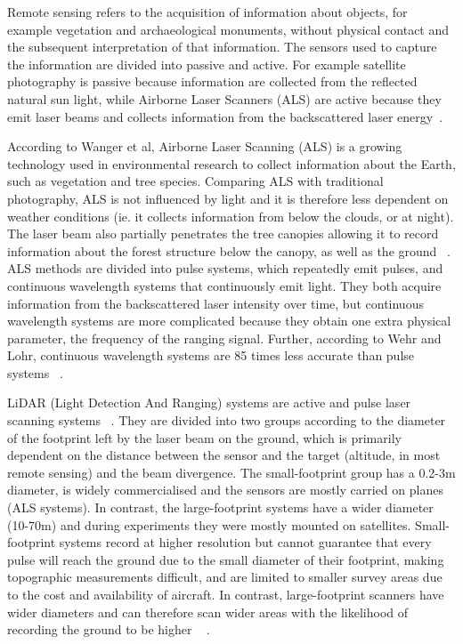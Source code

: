 \documentclass{subfiles}
\begin{document}
	\par Remote sensing refers to the acquisition of information about objects, {\color{blue} for example} vegetation and archaeological monuments, without physical contact and the subsequent interpretation of that information.  The sensors used to capture the information are divided into passive and active. For example satellite photography is passive because information are collected from the {\color{blue} reflected natural} sun light, while Airborne Laser Scanners (ALS) are active because they emit laser beams and collects information from the backscattered laser energy~\cite{Smith2012}.
	
	\par According to Wanger et al, Airborne Laser Scanning (ALS) is a growing technology used in environmental research to collect information about the Earth, such as vegetation and tree species. Comparing ALS with traditional photography, {\color{blue} ALS is not influenced by light and it is therefore less dependent on weather conditions (ie. it collects information from below the clouds, or at night)}. The laser beam also partially penetrates the tree canopies {\color{blue} allowing it to record} information about the forest structure below the canopy, as well as the ground ~\cite{Wanger2004}. {\color{blue}ALS methods are divided into pulse systems, which repeatedly emit pulses, and continuous wavelength systems that continuously emit light. They both acquire information from the backscattered laser intensity over time, but continuous wavelength systems are more complicated because they obtain one extra physical parameter, the frequency of the ranging signal}. Further, according to Wehr and Lohr, continuous wavelength systems are 85 times less accurate than pulse systems ~\cite{Wehr1999}.
	
	\par {\color{blue} LiDAR (Light Detection And Ranging) systems are active and pulse laser scanning systems ~\cite{Wehr1999}. They are divided into two groups according to the diameter of the footprint left by the laser beam on the ground, which is primarily dependent on the distance between the sensor and the target (altitude, in most remote sensing) and the beam divergence. The small-footprint group has a 0.2-3m diameter, is widely commercialised and the sensors are mostly carried on planes (ALS systems). In contrast, the large-footprint systems have a wider diameter (10-70m) and during experiments they were mostly mounted on satellites. Small-footprint systems record at higher resolution but cannot guarantee that every pulse will reach the ground due to the small diameter of their footprint, making topographic measurements difficult, and are limited to smaller survey areas due to the cost and availability of aircraft. In contrast, large-footprint scanners have wider diameters and can therefore scan wider areas with the likelihood of recording the ground to be higher ~\cite{Mallet2009} }. 
	
\end{document}
